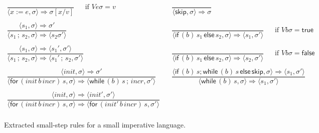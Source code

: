\documentclass{llncs}
\newcommand{\true}{\mathsf {true}}
\newcommand{\false}{\mathsf {false}}
\newcommand{\keyword}[1]{\mathsf{#1}}
\newcommand{\SKIP}{\keyword{skip}}
\newcommand{\ASG}[2]{#1 := #2}
\newcommand{\SEQ}[2]{#1\,{;}\,#2}
\newcommand{\IFNZ}[3]{\keyword{if} \,(#1)\, #2\,\keyword{else}\,#3}
\newcommand{\FOR}[4]{\keyword{for} \,(#1\,#2\,#3)\, #4}
\newcommand{\WHILE}[2]{\keyword{while} \,(#1)\, #2}
\begin{document}
\begin{figure}
\[
\begin{array}{l|l}
 \dfrac{ } 
{\langle \ASG{x}{e}, \sigma \rangle \Rightarrow \sigma[x/v]}
 ~~~~~~~\text{if } V e \sigma = v~~~

&~~~
\dfrac{} 
{\langle \SKIP, \sigma \rangle \Rightarrow \sigma}
\\
\\
\dfrac{\langle s_1, \sigma \rangle \Rightarrow \sigma' } 
{\langle \SEQ{s_1}{s_2}, \sigma \rangle \Rightarrow \langle s_2 \sigma'\rangle}~~~
&~~~
\dfrac{} 
{\langle \IFNZ{b}{s_1}{s_2}, \sigma \rangle \Rightarrow \langle s_1,\sigma'\rangle}
 ~~~~~~~\text{if } V b \sigma = \true\\
 \\
 \dfrac{\langle s_1, \sigma \rangle \Rightarrow \langle s_1', \sigma'\rangle} 
{\langle \SEQ{s_1}{s_2}, \sigma \rangle \Rightarrow \langle \SEQ{s_1'}{s_2}, \sigma'\rangle}~~~
 ~
&~~~
\dfrac{} 
{\langle \IFNZ{b}{s_1}{s_2}, \sigma \rangle \Rightarrow \langle s_2,\sigma'\rangle}
 ~~~~~~~\text{if } V b \sigma = \false\\
 \\
\dfrac{\langle \mathit{init}, \sigma \rangle \Rightarrow \sigma' } 
{\langle \FOR{\mathit{init}}{b}{\mathit{incr}}{s}, \sigma \rangle \Rightarrow \langle \WHILE{b}{\SEQ{s}{\mathit{incr}}}, \sigma' \rangle}
 ~
&~~~
\dfrac{\langle \IFNZ{b}{s;\WHILE{b}{s}}{\SKIP}, \sigma \rangle \Rightarrow \langle s_1,\sigma'\rangle} 
{\langle \WHILE{b}{s}, \sigma \rangle \Rightarrow \langle s_1,\sigma'\rangle}
\\
\\
 \dfrac{\langle \mathit{init}, \sigma \rangle \Rightarrow\langle \mathit{init}', \sigma' \rangle } 
{\langle \FOR{\mathit{init}}{b}{\mathit{incr}}{s}, \sigma \rangle \Rightarrow \langle \FOR{\mathit{init}'}{b}{\mathit{incr}}{s}, \sigma' \rangle}
 ~
&~~~
\\
 \end{array}
\]
\caption{Extracted small-step rules for a small imperative language.}\label{small-step-rules}
\end{figure}


%

\end{document}
